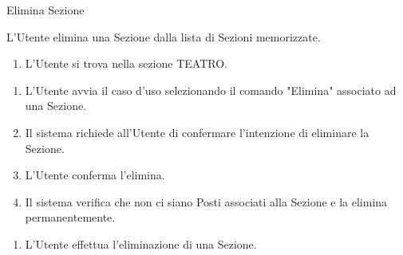 {\ucExtTable	%
{	%
	Elimina Sezione
	
}{	%
	
}{	%
	L'Utente elimina una Sezione dalla lista di Sezioni memorizzate.
	
}{	%
	\attori
	
}{	%
	\begin{enumerate}
        \item L'Utente si trova nella sezione TEATRO.
    \end{enumerate}
	
}{	%
	\begin{enumerate}
        \item L'Utente avvia il caso d'uso selezionando il comando "Elimina" associato ad una Sezione.
        \item Il sistema richiede all'Utente di confermare l'intenzione di eliminare la Sezione.
        \item L'Utente conferma l'elimina.
        \item Il sistema verifica che non ci siano Posti associati alla Sezione e la elimina permanentemente.
    \end{enumerate}
	
}{	%
	\begin{enumerate}
        \item L'Utente effettua l'eliminazione di una Sezione.
    \end{enumerate}
	
} }

